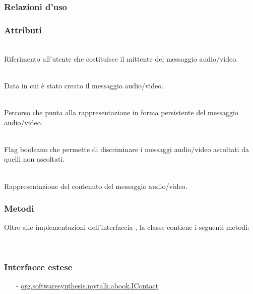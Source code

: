 \subsubsection*{Relazioni d'uso}

\subsubsection*{Attributi}
\begin{description}
  \item{}\\
Riferimento all'utente che costituisce il mittente del messaggio audio/video.
  \item{}\\
Data in cui è stato creato il messaggio audio/video.
  \item{}\\
Percorso che punta alla rappresentazione in forma persistente del messaggio audio/video.
  \item{}\\
Flag booleano che permette di discriminare i messaggi audio/video ascoltati da quelli non ascoltati.
  \item{}\\
Rappresentazione del contenuto del messaggio audio/video.
\end{description}

\subsubsection*{Metodi}
Oltre alle implementazioni dell'interfaccia , la classe contiene i seguenti metodi:
\begin{description}
  \item{}\\
\end{description}


\subsubsection*{Interfacce estese}
\begin{itemize}[noitemsep,nolistsep]
  \item[-] \hyperref[IContact]{\ttfamily{}org.softwaresynthesis.mytalk.abook.IContact}
\end{itemize}

